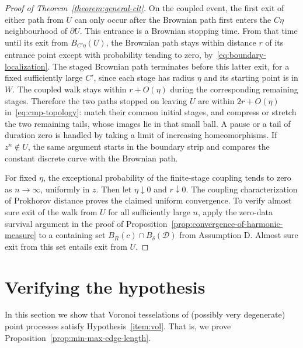\documentclass[12pt]{amsart}
\numberwithin{equation}{section}
\begin{document}
\begin{proof}[Proof of Theorem~\ref{theorem:general-clt}]
On the coupled event, the first exit of either path from $U$ can only occur after the Brownian path first enters the $C\eta$ neighbourhood of $\partial U$. This entrance is a Brownian stopping time. From that time until its exit from $B_{C'\eta}(U)$, the Brownian path stays within distance $r$ of its entrance point except with probability tending to zero, by~\eqref{eq:boundary-localization}. The staged Brownian path terminates before this latter exit, for a fixed sufficiently large $C'$, since each stage has radius $\eta$ and its starting point is in $W$. The coupled walk stays within $r+O(\eta)$ during the corresponding remaining stages. Therefore the two paths stopped on leaving $U$ are within $2r+O(\eta)$ in~\eqref{eq:cmp-topology}: match their common initial stages, and compress or stretch the two remaining tails, whose images lie in that small ball. A pause or a tail of duration zero is handled by taking a limit of increasing homeomorphisms. If $z^n\notin U$, the same argument starts in the boundary strip and compares the constant discrete curve with the Brownian path.

For fixed $\eta$, the exceptional probability of the finite-stage coupling tends to zero as $n\to\infty$, uniformly in $z$. Then let $\eta\downarrow0$ and $r\downarrow0$. The coupling characterization of Prokhorov distance proves the claimed uniform convergence. To verify almost sure exit of the walk from $U$ for all sufficiently large $n$, apply the zero-data survival argument in the proof of Proposition~\ref{prop:convergence-of-harmonic-measure} to a containing set $B_R(c)\cap B_\delta(\mathcal D)$ from Assumption D. Almost sure exit from this set entails exit from $U$.
\end{proof}













\section{Verifying the hypothesis} \label{sec:verifying-assumptions}
In this section we show that Voronoi tesselations of (possibly very degenerate) point processes satisfy Hypothesis~\ref{item:vol}.
That is, we prove Proposition~\ref{prop:min-max-edge-length}.
\end{document}
